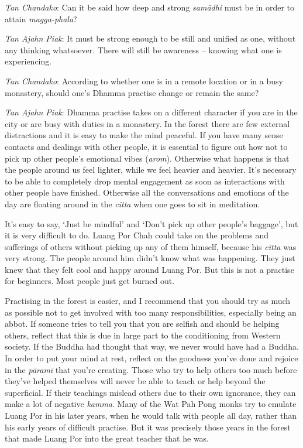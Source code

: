 \emph{Tan Chandako}: Can it be said how deep and strong \emph{samādhi}
must be in order to attain \emph{magga-phala}? 

\emph{Tan Ajahn Piak}: It must be strong enough to be still and unified
as one, without any thinking whatsoever. There will still be awareness
-- knowing what one is experiencing. 

\emph{Tan Chandako}: According to whether one is in a remote location or
in a busy monastery, should one's Dhamma practise change or remain the
same? 

\emph{Tan Ajahn Piak}: Dhamma practise takes on a different character if
you are in the city or are busy with duties in a monastery. In the
forest there are few external distractions and it is easy to make the
mind peaceful. If you have many sense contacts and dealings with other
people, it is essential to figure out how not to pick up other people's
emotional vibes (\emph{arom}). Otherwise what happens is that the people
around us feel lighter, while we feel heavier and heavier. It's
necessary to be able to completely drop mental engagement as soon as
interactions with other people have finished. Otherwise all the
conversations and emotions of the day are floating around in the
\emph{citta} when one goes to sit in meditation. 

It's easy to say, `Just be mindful' and `Don't pick up other people's
baggage', but it is very difficult to do. Luang Por Chah could take on
the problems and sufferings of others without picking up any of them
himself, because his \emph{citta} was very strong. The people around him
didn't know what was happening. They just knew that they felt cool and
happy around Luang Por. But this is not a practise for beginners. Most
people just get burned out.

Practising in the forest is easier, and I
recommend that you should try as much as possible not to get involved
with too many responsibilities, especially being an abbot. If someone
tries to tell you that you are selfish and should be helping others, 
reflect that this is due in large part to the conditioning from Western
society. If the Buddha had thought that way, we never would have had a
Buddha. In order to put your mind at rest, reflect on the goodness
you've done and rejoice in the \emph{pāramī} that you're creating. Those
who try to help others too much before they've helped themselves will
never be able to teach or help beyond the superficial. If their
teachings mislead others due to their own ignorance, they can make a lot
of negative \emph{kamma}. Many of the Wat Pah Pong monks try to emulate
Luang Por in his later years, when he would talk with people all day, 
rather than his early years of difficult practise. But it was precisely
those years in the forest that made Luang Por into the great teacher
that he was. 


